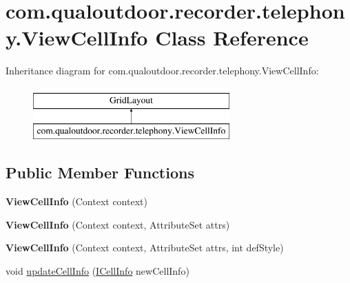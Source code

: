 \hypertarget{classcom_1_1qualoutdoor_1_1recorder_1_1telephony_1_1ViewCellInfo}{\section{com.\-qualoutdoor.\-recorder.\-telephony.\-View\-Cell\-Info Class Reference}
\label{classcom_1_1qualoutdoor_1_1recorder_1_1telephony_1_1ViewCellInfo}
}
Inheritance diagram for com.\-qualoutdoor.\-recorder.\-telephony.\-View\-Cell\-Info\-:\begin{figure}[H]
\begin{center}
\leavevmode
\includegraphics[height=2.000000cm]{classcom_1_1qualoutdoor_1_1recorder_1_1telephony_1_1ViewCellInfo}
\end{center}
\end{figure}
\subsection*{Public Member Functions}
\begin{DoxyCompactItemize}
\item 
\hypertarget{classcom_1_1qualoutdoor_1_1recorder_1_1telephony_1_1ViewCellInfo_abc4e555641112f8b3524296bbd311fc8}{{\bfseries View\-Cell\-Info} (Context context)}\label{classcom_1_1qualoutdoor_1_1recorder_1_1telephony_1_1ViewCellInfo_abc4e555641112f8b3524296bbd311fc8}

\item 
\hypertarget{classcom_1_1qualoutdoor_1_1recorder_1_1telephony_1_1ViewCellInfo_a3e23bec4ae5ccb0e030e3cd33386fdc7}{{\bfseries View\-Cell\-Info} (Context context, Attribute\-Set attrs)}\label{classcom_1_1qualoutdoor_1_1recorder_1_1telephony_1_1ViewCellInfo_a3e23bec4ae5ccb0e030e3cd33386fdc7}

\item 
\hypertarget{classcom_1_1qualoutdoor_1_1recorder_1_1telephony_1_1ViewCellInfo_aac86115b91cd05f0f3ce9770293fb41e}{{\bfseries View\-Cell\-Info} (Context context, Attribute\-Set attrs, int def\-Style)}\label{classcom_1_1qualoutdoor_1_1recorder_1_1telephony_1_1ViewCellInfo_aac86115b91cd05f0f3ce9770293fb41e}

\item 
void \hyperlink{classcom_1_1qualoutdoor_1_1recorder_1_1telephony_1_1ViewCellInfo_a3f59e6469ef093d69fb8a5b6ef06a99e}{update\-Cell\-Info} (\hyperlink{interfacecom_1_1qualoutdoor_1_1recorder_1_1telephony_1_1ICellInfo}{I\-Cell\-Info} new\-Cell\-Info)
\end{DoxyCompactItemize}
